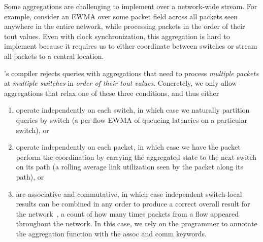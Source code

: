 Some aggregations are challenging to implement over a network-wide stream. For
example, consider an EWMA over some packet field across all packets seen
anywhere in the entire network, while processing packets in the order of their
{\ct tout} values. Even with clock synchronization, this aggregation is hard to
implement because it requires us to either coordinate between switches or
stream all packets to a central location.

\TheSystem's compiler rejects queries with aggregations that need to process
{\em multiple packets} at {\em multiple switches} in {\em order of their {\ct tout}
values}. Concretely, we only allow aggregations that relax one of these three
conditions, and thus either
\begin{enumerate}
\item operate independently on each switch, in which case we naturally
  partition queries by switch (\eg a per-flow EWMA of queueing latencies on a
  particular switch), or
\item operate independently on each packet, in which case we have the packet
  perform the coordination by carrying the aggregated state to the next switch on
  its path (\eg a rolling average link utilization seen by the packet
  along its path), or
\item are associative and commutative, in which case independent switch-local results can be
  combined in any order to produce a correct overall result for the network~\cite{theory-tr},
  \eg a count of how many times packets from a flow
  appeared throughout the network. In this case, we rely on the
  programmer to annotate the aggregation function with the
  {\ct assoc} and {\ct comm} keywords.
\end{enumerate}
